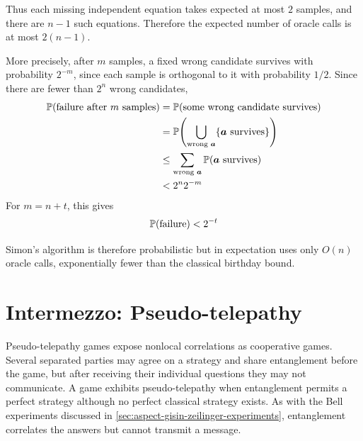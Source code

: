 Thus each missing independent equation takes expected at most \(2\) samples, and there are \(n-1\) such equations.
Therefore the expected number of oracle calls is at most \(2(n-1)\).

More precisely, after \(m\) samples, a fixed wrong candidate survives with probability \(2^{-m}\), since each sample is orthogonal to it with probability \(1/2\).
Since there are fewer than \(2^n\) wrong candidates, %
\[
\begin{aligned}
\operatorname{\mathbb{P}}(\text{failure after $m$ samples})
&=
\operatorname{\mathbb{P}}(\text{some wrong candidate survives})
\\
&=
\operatorname{\mathbb{P}}\Biggl(\bigcup_{\text{wrong ${\boldsymbol{a}}$}}\{\text{${\boldsymbol{a}}$ survives}\}\Biggr)
\\
&\leq
\sum_{\text{wrong ${\boldsymbol{a}}$}}
\operatorname{\mathbb{P}}(\text{${\boldsymbol{a}}$ survives})
\\
&<
2^n 2^{-m}
\end{aligned}
\]
For \(m=n+t\), this gives
\[
\operatorname{\mathbb{P}}(\text{failure})
<
2^{-t}
\]

Simon's algorithm is therefore probabilistic but in expectation uses only \(O(n)\) oracle calls, exponentially fewer than the classical birthday bound.





\clearpage
\section{Intermezzo: Pseudo-telepathy}\label{sec:pseudo-telepathy}

Pseudo-telepathy games expose nonlocal correlations as cooperative games.
Several separated parties may agree on a strategy and share entanglement before the game, but after receiving their individual questions they may not communicate.
A game exhibits pseudo-telepathy when entanglement permits a perfect strategy although no perfect classical strategy exists.
As with the Bell experiments discussed in \autoref{sec:aspect-gisin-zeilinger-experiments}, entanglement correlates the answers but cannot transmit a message.

